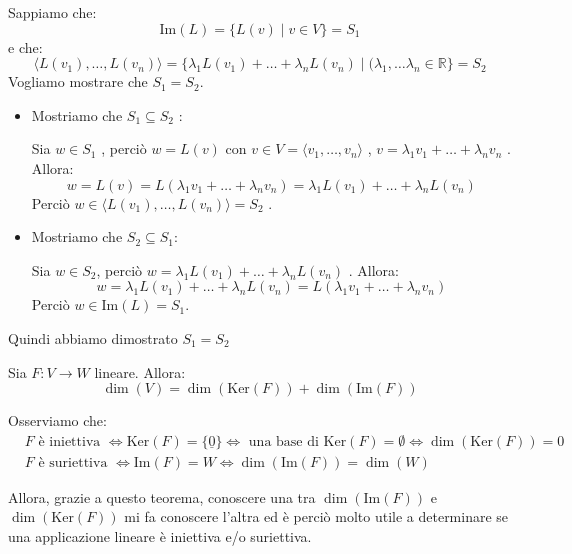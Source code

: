 \documentclass[
  a4paper,
]{article}
\begin{document}
\begin{proofbox}
Sappiamo che: \[
\text{Im}(L) = \{L(v) \mid v \in V\} = S_1
\] e che: \[
\langle L(v_1), \dots , L(v_n) \rangle = \{\lambda_1 L(v_1) + \dots + \lambda_n L(v_n) \mid (\lambda_1, \dots \lambda_n \in \mathbb{R}\} = S_2
\] Vogliamo mostrare che \(S_1 = S_2\).

\begin{itemize}
\item
  Mostriamo che \(S_1 \subseteq S_2\) :

  Sia \(w \in S_1\) , perciò \(w = L(v)\) con
  \(v \in V = \langle v_1, \dots, v_n \rangle\) ,
  \(v = \lambda_1 v_1 + \dots + \lambda_n v_n\) . Allora: \[
   w = L(v) = L(\lambda_1 v_1 + \dots + \lambda_n v_n) = \lambda_1 L(v_1) + \dots + \lambda_n L(v_n)
   \] Perciò \(w \in \langle L(v_1), \dots , L(v_n) \rangle = S_2\) .
\item
  Mostriamo che \(S_2 \subseteq S_1\):

  Sia \(w \in S_2\), perciò
  \(w = \lambda_1 L(v_1) + \dots + \lambda_n L(v_n)\) . Allora: \[
   w = \lambda_1 L(v_1) + \dots + \lambda_n L(v_n) = L(\lambda_1 v_1 + \dots + \lambda_n v_n)
   \] Perciò \(w \in \text{Im}(L) = S_1\).
\end{itemize}

Quindi abbiamo dimostrato \(S_1 = S_2\)
\end{proofbox}

\begin{teoremabox}
Sia \(F: V \to W\) lineare. Allora:\\
\[
\dim(V) = \dim(\text{Ker}(F)) + \dim(\text{Im}(F))
\]
\end{teoremabox}

\begin{observationbox}
Osserviamo che: \[
\begin{aligned}
&F \text{ è iniettiva } \iff \text{Ker}(F) = \{\underline{0}\} \iff \text{ una base di } \text{Ker}(F) = \emptyset \iff \dim(\text{Ker}(F)) = 0 \\
&F \text{ è suriettiva } \iff \text{Im}(F) = W \iff \dim(\text{Im}(F)) = \dim(W)
\end{aligned}
\]

Allora, grazie a questo teorema, conoscere una tra
\(\dim(\text{Im}(F))\) e \(\dim(\text{Ker}(F))\) mi fa conoscere l'altra
ed è perciò molto utile a determinare se una applicazione lineare è
iniettiva e/o suriettiva.
\end{observationbox}
\end{document}

